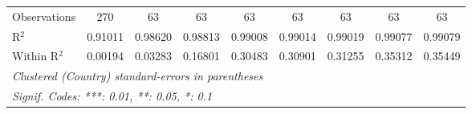 \begin{table}[htbp]
\begin{tabular}{lcccccccc}
      Observations                                                             & 270      & 63       & 63             & 63              & 63              & 63              & 63              & 63\\  
      R$^2$                                                                    & 0.91011  & 0.98620  & 0.98813        & 0.99008         & 0.99014         & 0.99019         & 0.99077         & 0.99079\\  
      Within R$^2$                                                             & 0.00194  & 0.03283  & 0.16801        & 0.30483         & 0.30901         & 0.31255         & 0.35312         & 0.35449\\  
      \midrule \midrule
      \multicolumn{9}{l}{\emph{Clustered (Country) standard-errors in parentheses}}\\
      \multicolumn{9}{l}{\emph{Signif. Codes: ***: 0.01, **: 0.05, *: 0.1}}\\
   \end{tabular}
\end{table}


